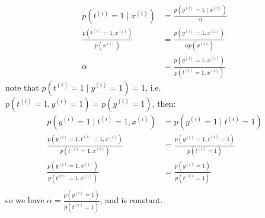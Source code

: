 \begin{answer}
    $$
    \begin{aligned}
        p(t^{(i)}=1 \mid x^{(i)}) &= \frac{p(y^{(i)}=1 \mid x^{(i)})}{\alpha}\\
        \frac{p(t^{(i)}=1 , x^{(i)})}{p(x^{(i)})} &= \frac{p(y^{(i)}=1 , x^{(i)})}{\alpha p(x^{(i)})} \\
        \alpha &= \frac{p(y^{(i)}=1 , x^{(i)})}{p(t^{(i)}=1 , x^{(i)})}
    \end{aligned}
    $$
    note that $p(t^{(i)}=1\mid y^{(i)}=1) = 1$, i.e. $p(t^{(i)}=1, y^{(i)}=1)=p(y^{(i)}=1)$, then:\\
    $$
    \begin{aligned}
        p(y^{(i)} = 1\mid t^{(i)} = 1, x^{(i)}) &= p(y^{(i)} = 1\mid t^{(i)} = 1) \\
        \frac{p(y^{(i)} = 1, t^{(i)} = 1, x^{(i)})}{p(t^{(i)} = 1, x^{(i)}) } &= \frac{p(y^{(i)} = 1, t^{(i)} = 1)}{p(t^{(i)} = 1)}\\
        \frac{p(y^{(i)} = 1, x^{(i)})}{p(t^{(i)} = 1, x^{(i)}) } &= \frac{p(y^{(i)} = 1)}{p(t^{(i)} = 1)}\\
    \end{aligned}
    $$
    so we have $\alpha = \frac{p(y^{(i)} = 1)}{p(t^{(i)} = 1)}$, and is constant. 
\end{answer}
